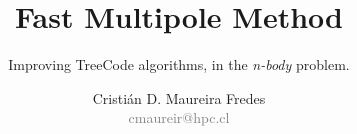 \documentclass{beamer}
\author[Cristián D. Maureira Fredes]{\large Cristián D. Maureira Fredes\\\normalsize \textcolor{gray}{cmaureir@hpc.cl}}
\title[Fast Multipole Method (FMM)]{\Huge Fast Multipole Method}
\subtitle{Improving TreeCode algorithms, in the \emph{n-body} problem.}
\institute{Universidad Técnica\\ Federico Santa María}
\begin{document}
\begin{frame}[t,plain]
\titlepage
\end{frame}



\begin{frame}[t,plain]
\titlepage
\end{frame}
\end{document}
